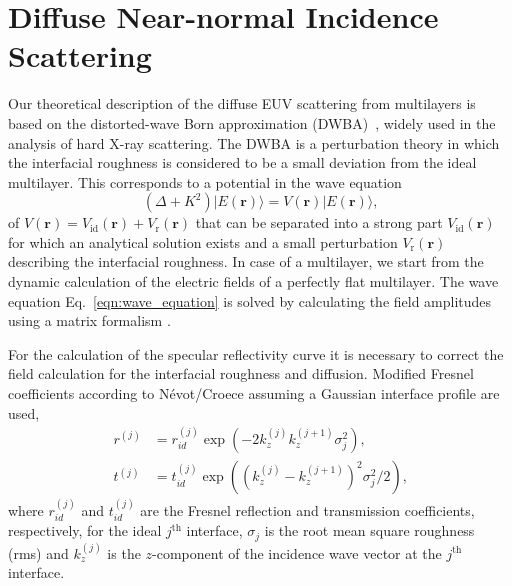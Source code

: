 \section{Diffuse Near-normal Incidence Scattering}
Our theoretical description of the diffuse EUV scattering from multilayers is based on the distorted-wave Born approximation (DWBA)~\cite{holy_nonspecular_1994,holy_x-ray_1993}, widely used in the analysis of hard X-ray scattering. The DWBA is a perturbation theory in which the interfacial roughness is considered to be a small deviation from the ideal multilayer. This corresponds to a potential in the wave equation 
\begin{equation}
        (\Delta + K^2) |E(\mathbf{r})\rangle = V(\mathbf{r}) |E(\mathbf{r})\rangle\text{,} \label{eqn:wave_equation} 
\end{equation}
of $V(\mathbf{r}) = V_\text{id}(\mathbf{r}) + V_\text{r}(\mathbf{r})$ that can be separated into a strong part $V_\text{id}(\mathbf{r})$ for which an analytical solution exists and a small perturbation $V_\text{r}(\mathbf{r})$ describing the interfacial roughness. In case of a multilayer, we start from the dynamic calculation of the electric fields of a perfectly flat multilayer. The wave equation Eq.~\eqref{eqn:wave_equation} is solved by calculating the field amplitudes using a matrix formalism \cite{born_principles_1965}.

For the calculation of the specular reflectivity curve it is necessary to correct the field calculation for the interfacial roughness and diffusion. Modified Fresnel coefficients according to N\'evot/Croece \cite{nevot_l._caracterisation_1980} assuming a Gaussian interface profile are used, 
\begin{align}
        r^{(j)} &= r_{id}^{(j)} \exp(-2 k_z^{(j)} k_z^{(j+1)} \sigma_j^2)\text{,} \label{eqn:fresnel_r}\\
        t^{(j)} &= t_{id}^{(j)} \exp((k_z^{(j)} - k_z^{(j+1)})^2 \sigma_j^2/2) \text{,} \label{eqn:fresnel_t}
\end{align}
where $r_{id}^{(j)}$ and $t_{id}^{(j)}$ are the Fresnel reflection and transmission coefficients, respectively, for the ideal  $j^\text{th}$ interface, $\sigma_j$ is the root mean square roughness (rms) and $k_z^{(j)}$ is the $z$-component of the incidence wave vector at the $j^\text{th}$ interface.

